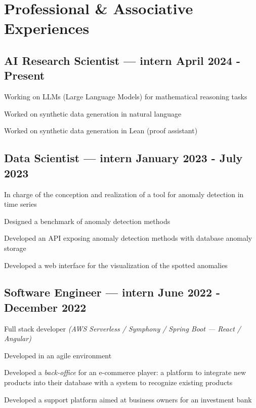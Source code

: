 \section{Professional \& Associative Experiences}
\vspace{0.1cm}

\subsection{{AI Research Scientist --- intern \hfill April 2024 - Present}}
\begin{zitemize}
    \item Working on LLMs (Large Language Models) for mathematical reasoning tasks
    \item Worked on synthetic data generation in natural language
    \item Worked on synthetic data generation in Lean (proof assistant)
\end{zitemize}
\vspace{0.1cm}

\subsection{{Data Scientist --- intern \hfill January 2023 - July 2023}}
\begin{zitemize}
    \item In charge of the conception and realization of a tool for anomaly detection in time series
    \item Designed a benchmark of anomaly detection methods
    \item Developed an API exposing anomaly detection methods with database anomaly storage
    \item Developed a web interface for the visualization of the spotted anomalies
\end{zitemize}
\vspace{0.1cm}

\subsection{{Software Engineer --- intern \hfill June 2022 - December 2022}}
\begin{zitemize}
    \item Full stack developer \textit{(AWS Serverless / Symphony / Spring Boot --- React / Angular)}
    \item Developed in an agile environment
    \item Developed a \textit{back-office} for an e-commerce player: a platform to integrate new products into their database with a system to recognize existing products
    \item Developed a support platform aimed at business owners for an investment bank
\end{zitemize}
\vspace{0.1cm}

